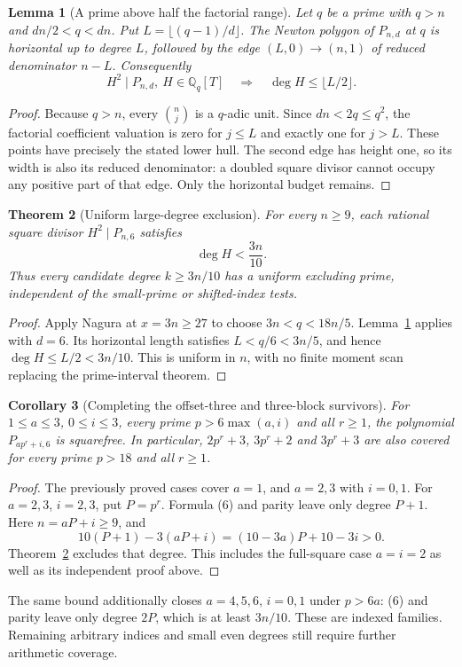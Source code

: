 \documentclass[11pt]{article}
\newtheorem{theorem}{Theorem}
\newtheorem{lemma}[theorem]{Lemma}
\newtheorem{corollary}[theorem]{Corollary}
\newcommand{\Q}{\mathbb Q}
\begin{document}
\begin{lemma}[A prime above half the factorial range]\label{lem:highprime}
Let $q$ be a prime with $q>n$ and $dn/2<q<dn$.
Put $L=\lfloor(q-1)/d\rfloor$. The Newton polygon of $P_{n,d}$
at $q$ is horizontal up to degree $L$, followed by the edge
$(L,0)\to(n,1)$ of reduced denominator $n-L$. Consequently
\[
 H^2\mid P_{n,d},\ H\in\Q_q[T]
 \quad\Longrightarrow\quad \deg H\le\lfloor L/2\rfloor. \tag{10}
\]
\end{lemma}
\begin{proof}
Because $q>n$, every $\binom nj$ is a $q$-adic unit.
Since $dn<2q\le q^2$, the factorial coefficient valuation is zero
for $j\le L$ and exactly one for $j>L$. These points have precisely
the stated lower hull. The second edge has height one, so its width
is also its reduced denominator: a doubled square divisor cannot
occupy any positive part of that edge. Only the horizontal budget remains.
\end{proof}

\begin{theorem}[Uniform large-degree exclusion]\label{thm:large}
For every $n\ge9$, each rational square divisor $H^2\mid P_{n,6}$ satisfies
\[
 \boxed{\deg H<\frac{3n}{10}.} \tag{11}
\]
Thus every candidate degree $k\ge3n/10$ has a uniform excluding prime,
independent of the small-prime or shifted-index tests.
\end{theorem}
\begin{proof}
Apply Nagura at $x=3n\ge27$ to choose
$3n<q<18n/5$. Lemma~\ref{lem:highprime} applies with $d=6$.
Its horizontal length satisfies $L<q/6<3n/5$, and hence
$\deg H\le L/2<3n/10$. This is uniform in $n$, with no finite
moment scan replacing the prime-interval theorem.
\end{proof}

\begin{corollary}[Completing the offset-three and three-block survivors]\label{cor:threeblocks}
For $1\le a\le3$, $0\le i\le3$, every prime $p>6\max(a,i)$ and
all $r\ge1$, the polynomial $P_{ap^r+i,6}$ is squarefree.
In particular, $2p^r+3$, $3p^r+2$ and $3p^r+3$ are also covered
for every prime $p>18$ and all $r\ge1$.
\end{corollary}
\begin{proof}
The previously proved cases cover $a=1$, and $a=2,3$ with $i=0,1$.
For $a=2,3$, $i=2,3$, put $P=p^r$. Formula (6) and parity leave
only degree $P+1$. Here $n=aP+i\ge9$, and
\[
 10(P+1)-3(aP+i)=(10-3a)P+10-3i>0.
\]
Theorem~\ref{thm:large} excludes that degree. This includes the
full-square case $a=i=2$ as well as its independent proof above.
\end{proof}
The same bound additionally closes $a=4,5,6$, $i=0,1$ under $p>6a$:
(6) and parity leave only degree $2P$, which is at least $3n/10$.
These are indexed families. Remaining arbitrary indices and small even
degrees still require further arithmetic coverage.
\end{document}
